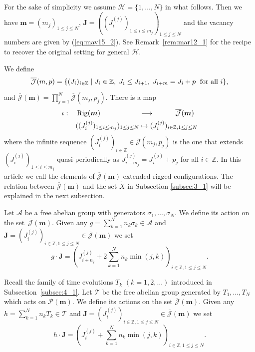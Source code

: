 \documentclass[pdftex]{sigma}
\newcommand{\Z}{{\mathbb Z}}
\newcommand{\J}{{\mathcal J}}
\newcommand{\Jb}{{\overline{\mathcal J}}}
\newcommand{\Rig}{{\rm Rig}}
\newcommand{\m}{{\boldsymbol m}}
\newcommand{\boJ}{{\boldsymbol J}}
\renewcommand{\H}{{\mathcal H}}
\begin{document}
For the sake of simplicity we assume $\H=\{1,\ldots,N\}$ in what follows.
Then we have $\m = (m_j)_{1 \leq j \leq N}$, $\boJ=((J^{(j)}_i)_{1 \le i \le m_{j}})_{1 \leq j \leq N}$
and the vacancy numbers are given by (\ref{eq:may15_2}).
See Remark~\ref{rem:mar12_1} for the recipe to recover the original setting for general $\H$.

We def\/ine
\begin{equation}
{\Jb} (m,p) = \{(J_i)_{i \in \Z} \mid
J_i \in \Z, \; J_i \le J_{i+1}, \; J_{i+m} = J_i + p\;
\hbox{ for all } i \},\label{eq:jcomp}
\end{equation}
and $\Jb (\m) = \prod_{j=1}^N {\Jb} (m_j,p_j)$.
There is a map
\begin{equation}\label{eq:iota}
\begin{split}
\iota : \quad
\Rig(\m) \qquad \quad\;\;
\qquad&\longrightarrow \qquad\quad
\Jb(\m)\\
((J^{(j)}_i)_{1 \le i \le m_{j}})_{1 \leq j \leq N}
&\mapsto
{(J^{(j)}_i)_{i \in \Z, 1 \leq j \leq N}}
\end{split}
\end{equation}
where the inf\/inite sequence $({J}^{(j)}_i)_{i \in \Z} \in {\Jb} (m_j,p_j)$
is the one that extends
$(J^{(j)}_i)_{1 \le i \le m_j}$ quasi-periodically as
${J}^{(j)}_{i+m_j}={J}^{(j)}_i+p_j$ for all $i \in \Z$.
{In this article we call the elements of $\Jb (\m)$ extended rigged conf\/igurations}.
{The relation between $\Jb (\m)$ and the set $\tilde{X}$ in Subsection \ref{subsec:3_1} will be explained in the next subsection.}

Let ${\mathcal A}$ be a free abelian group with generators $\sigma_1,\ldots,\sigma_N$.
We def\/ine its action
on the set~$\Jb (\m)$.
Given any $g = \sum_{k=1}^N n_k \sigma_k \in {\mathcal A}$ and
$\boJ = (J_i^{(j)})_{i \in \Z, 1 \leq j \leq N} \in \Jb (\m)$
we set
\begin{displaymath}
g \cdot \boJ = \left( J_{i+n_j}^{(j)} + 2 \sum_{k=1}^N n_k \min (j,k) \right)_{i \in \Z, 1 \leq j \leq N}.
\end{displaymath}


Recall the family of time evolutions $T_k$ $(k=1,2,\ldots)$ introduced in Subsection~\ref{subsec:4_1}.
Let ${\mathcal T}$ be the free abelian group generated by $T_1,\ldots,T_N$ which
acts on ${\mathcal P}(\m)$.
We def\/ine its actions on the set $\Jb (\m)$.
Given any $h = \sum_{k=1}^N n_k T_k \in {\mathcal T}$
and $\boJ = (J^{(j)}_i)_{i \in \Z, 1 \leq j \leq N} \in \Jb (\m)$
we set
\begin{displaymath}
h \cdot \boJ = \left( J_{i}^{(j)} + \sum_{k=1}^N n_k \min (j,k) \right)_{i \in \Z, 1 \leq j \leq N}.
\end{displaymath}
\end{document}
